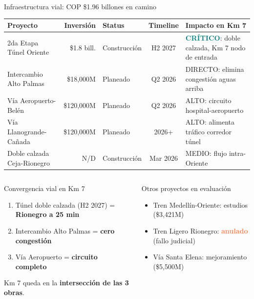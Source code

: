 \documentclass[aspectratio=169, 11pt]{beamer}
\newcommand{\highlight}[1]{\textcolor{teal}{\textbf{#1}}}
\newcommand{\danger}[1]{\textcolor{coral}{\textbf{#1}}}
\newcommand{\src}[1]{\par\vspace{2pt}{\tiny\textcolor{slate}{Fuente: #1}}}
\begin{document}
\begin{frame}{Infraestructura vial: COP \$1.96 billones en camino}

{\tiny
\begin{tabular}{@{}p{3.0cm}rlcp{4.5cm}@{}}
\toprule
\textbf{Proyecto} & \textbf{Inversión} & \textbf{Status} & \textbf{Timeline} & \textbf{Impacto en Km 7} \\
\midrule
\rowcolor{teal!8}
2da Etapa Túnel Oriente & \$1.8 bill. & Construcción & H2 2027 & \highlight{CRÍTICO}: doble calzada, Km 7 nodo de entrada \\
Intercambio Alto Palmas & \$18,000M & Planeado & Q2 2026 & DIRECTO: elimina congestión aguas arriba \\
Vía Aeropuerto-Belén & \$120,000M & Planeado & Q2 2026 & ALTO: circuito hospital-aeropuerto \\
Vía Llanogrande-Cañada & \$120,000M & Planeado & 2026+ & ALTO: alimenta tráfico corredor túnel \\
Doble calzada Ceja-Rionegro & N/D & Construcción & Mar 2026 & MEDIO: flujo intra-Oriente \\
\bottomrule
\end{tabular}
}

\vspace{8pt}
\begin{columns}[T]
\begin{exampleblock}{\small Convergencia vial en Km 7}
\footnotesize
\begin{enumerate}
  \item Túnel doble calzada (H2 2027) = \textbf{Rionegro a 25 min}
  \item Intercambio Alto Palmas = \textbf{cero congestión}
  \item Vía Aeropuerto = \textbf{circuito completo}
\end{enumerate}

\vspace{3pt}
Km 7 queda en la \textbf{intersección de las 3 obras}.
\end{exampleblock}

\begin{block}{\small Otros proyectos en evaluación}
\footnotesize
\begin{itemize}
  \item Tren Medellín-Oriente: estudios (\$3,421M)
  \item Tren Ligero Rionegro: \danger{anulado} (fallo judicial)
  \item Vía Santa Elena: mejoramiento (\$5,500M)
\end{itemize}
\end{block}
\end{columns}

\src{ANI, INVIAS, Gobernación de Antioquia, Plan Maestro JMC 2055}
\end{frame}
\end{document}

